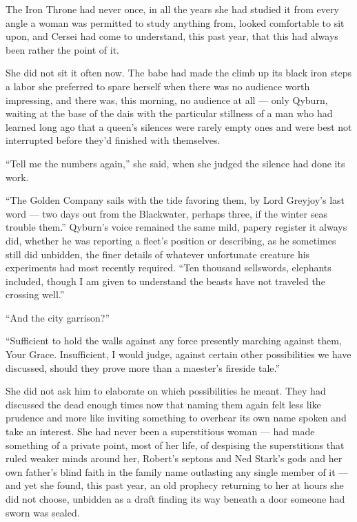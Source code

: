 The Iron Throne had never once, in all the years she had studied it from every angle a woman was permitted to study anything from, looked comfortable to sit upon, and Cersei had come to understand, this past year, that this had always been rather the point of it.

She did not sit it often now. The babe had made the climb up its black iron steps a labor she preferred to spare herself when there was no audience worth impressing, and there was, this morning, no audience at all — only Qyburn, waiting at the base of the dais with the particular stillness of a man who had learned long ago that a queen’s silences were rarely empty ones and were best not interrupted before they’d finished with themselves.

“Tell me the numbers again,” she said, when she judged the silence had done its work.

“The Golden Company sails with the tide favoring them, by Lord Greyjoy’s last word — two days out from the Blackwater, perhaps three, if the winter seas trouble them.” Qyburn’s voice remained the same mild, papery register it always did, whether he was reporting a fleet’s position or describing, as he sometimes still did unbidden, the finer details of whatever unfortunate creature his experiments had most recently required. “Ten thousand sellswords, elephants included, though I am given to understand the beasts have not traveled the crossing well.”

“And the city garrison?”

“Sufficient to hold the walls against any force presently marching against them, Your Grace. Insufficient, I would judge, against certain other possibilities we have discussed, should they prove more than a maester’s fireside tale.”

She did not ask him to elaborate on which possibilities he meant. They had discussed the dead enough times now that naming them again felt less like prudence and more like inviting something to overhear its own name spoken and take an interest. She had never been a superstitious woman — had made something of a private point, most of her life, of despising the superstitions that ruled weaker minds around her, Robert’s septons and Ned Stark’s gods and her own father’s blind faith in the family name outlasting any single member of it — and yet she found, this past year, an old prophecy returning to her at hours she did not choose, unbidden as a draft finding its way beneath a door someone had sworn was sealed.

